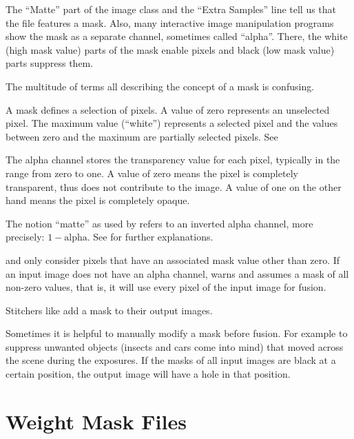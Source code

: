 %
%
%
The ``Matte'' part of the image class and the ``Extra Samples'' line tell us that the file
features a mask.  Also, many interactive image manipulation programs show the mask as a separate
channel, sometimes called ``alpha''.  There, the white (high mask value) parts of the mask
enable pixels and black (low mask value) parts suppress them.

The multitude of terms all describing the concept of a mask is confusing.

\begin{description}
\item[Mask]\itemend
  A mask defines a selection of pixels.  A value of zero represents an unselected pixel.  The
  maximum value (``white'') represents a selected pixel and the values between zero and the
  maximum are partially selected pixels.  See 

\item[Alpha Channel]\itemend
  The alpha channel stores the transparency value for each pixel, typically in the range from
  zero to one.  A value of zero means the pixel is completely transparent, thus does not
  contribute to the image.  A value of one on the other hand means the pixel is completely
  opaque.

\item[Matte]\itemend
  The notion ``matte'' as used by  refers to an inverted alpha channel,
  more precisely: $1 - \mbox{alpha}$.  See
   for further explanations.
\end{description}

\App{} and \OtherApp{} only consider pixels that have an associated mask value other than zero.
If an input image does not have an alpha channel,  warns and assumes a mask
of all non-zero values, that is, it will use every pixel of the input image for fusion.

%
Stitchers like  add a mask to their output images.

Sometimes it is helpful to manually modify a mask before fusion.  For example to suppress
unwanted objects (insects and cars come into mind) that moved across the scene during the
exposures.  If the masks of all input images are black at a certain position, the output image
will have a hole in that position.


\section[Weight Mask Files]{\label{sec:weight-mask-files}%
  Weight Mask Files}




